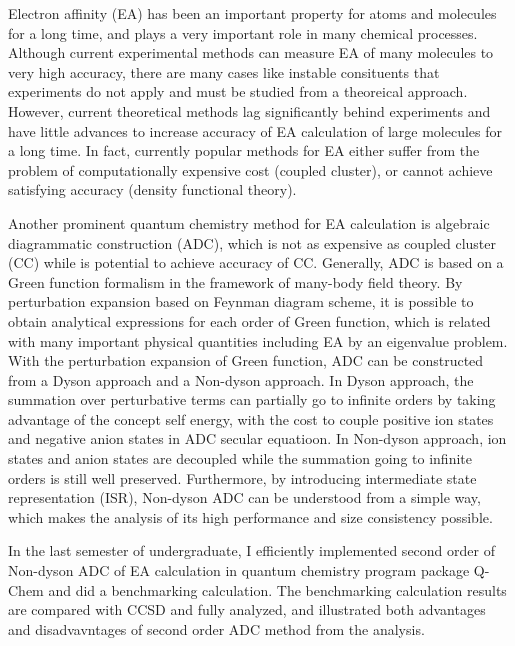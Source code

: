 \begin{enabstract}
	Electron affinity (EA) has been an important property for atoms and molecules for a long time, and plays a very important role in many chemical processes.
	Although current experimental methods can measure EA of many molecules to very high accuracy, there are many cases like instable consituents that experiments do not apply and must be studied from a theoreical approach.
	However, current theoretical methods lag significantly behind experiments and have little advances to increase accuracy of EA calculation of large molecules for a long time.
	In fact, currently popular methods for EA either suffer from the problem of computationally expensive cost (coupled cluster), or cannot achieve satisfying accuracy (density functional theory).
	
	Another prominent quantum chemistry method for EA calculation is algebraic diagrammatic construction (ADC), which is not as expensive as coupled cluster (CC) while is potential to achieve accuracy of CC.
	Generally, ADC is based on a Green function formalism in the framework of many-body field theory.
	By perturbation expansion based on Feynman diagram scheme, it is possible to obtain analytical expressions for each order of Green function, which is related with many important physical quantities including EA by an eigenvalue problem.
	With the perturbation expansion of Green function, ADC can be constructed from a Dyson approach and a Non-dyson approach.
	In Dyson approach, the summation over perturbative terms can partially go to infinite orders by taking advantage of the concept self energy, with the cost to couple positive ion states and negative anion states in ADC secular equatioon.
	In Non-dyson approach, ion states and anion states are decoupled while the summation going to infinite orders is still well preserved.
	Furthermore, by introducing intermediate state representation (ISR), Non-dyson ADC can be understood from a simple way, which makes the analysis of its high performance and size consistency possible.

	In the last semester of undergraduate, I efficiently implemented second order of Non-dyson ADC of EA calculation in quantum chemistry program package Q-Chem and did a benchmarking calculation.
	The benchmarking calculation results are compared with CCSD and fully analyzed, and illustrated both advantages and disadvavntages of second order ADC method from the analysis.
\end{enabstract}
